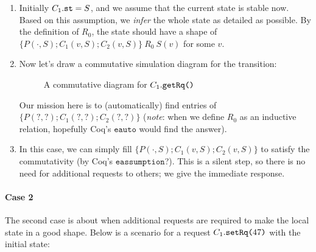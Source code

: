 \documentclass[format=manuscript]{acmart}
\begin{document}
\begin{enumerate}
\item Initially $C_1.\texttt{st} = S$, and we assume that the current state is stable
  now. Based on this assumption, we \emph{infer} the whole state as detailed as
  possible. By the definition of $R_0$, the state should have a shape of $\{
  P(\cdot, S); C_1(v, S); C_2(v, S) \}\ R_0\ S(v)$ for some $v$.
\item Now let's draw a commutative simulation diagram for the transition:
  \begin{figure}[h]
    \caption{A commutative diagram for $C_1.\texttt{getRq()}$}
    \label{fig:comm-diagram-getrq}
  \end{figure}
  
  Our mission here is to (automatically) find entries of $\{ P(?, ?); C_1(?, ?);
  C_2(?, ?) \}$ (\emph{note}: when we define $R_0$ as an inductive relation,
  hopefully Coq's $\texttt{eauto}$ would find the answer).
\item In this case, we can simply fill $\{ P(\cdot, S); C_1(v, S); C_2(v, S) \}$
  to satisfy the commutativity (by Coq's $\texttt{eassumption}$?). This is a
  silent step, so there is no need for additional requests to others; we give
  the immediate response.
\end{enumerate}

\paragraph{Case 2}
The second case is about when additional requests are required to make the local
state in a good shape. Below is a scenario for a request $C_1.\texttt{setRq(}47\texttt{)}$
with the initial state:
\end{document}
